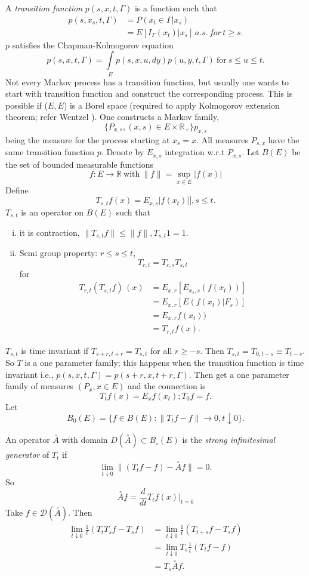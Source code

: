 A \textit{transition function} $p (s,x,t,\Gamma)$ is a function such that 
\begin{align*}
  p(s,x_s, t, \Gamma ) & = P(x_t \in \Gamma | x_s) \\
  & = E[I_\Gamma (x_t) | x_s]\, a.s. \,for\, t \ge s.
\end{align*}
$p$ satisfies the Chapman-Kolmogorov equation
$$
p(s,x,t,\Gamma) = \int\limits_E p(s,x,u,dy) p(u,y,t, \Gamma)
~\text{for}~ s \le u \le t. 
$$
Not every Markov process has a transition function, but usually one
wants to start with transition function and construct the corresponding
process. This is possible if ($E, E$) is a Borel space (required to
apply Kolmogorov extension theorem; refer Wentzel \cite{key27}). One
constructs a Markov family,  
$$
\{ P_{x,s}, (x,s) \in  E \times \mathbb{R}_+ \} p_{x,s}
$$
being the measure for the process starting at $x_s = x$. All measures
$P_{s,x}$ have the same transition function $p$. Denote by $E_{x,s}$
integration w.r.t $P_{x,s}$. Let $B(E)$ be the set of bounded
measurable functions  
$$
f : E \to \mathbb{R} ~\text{with}~\| f \| = \sup_{x \in E} |f(x)|
$$\pageoriginale
Define  
$$
 T_{s,t} f(x) =E_{x,s}| f(x_t)|], s\leq t.
$$
$T_{s,t}$ is an operator on $B(E)$ such that 
\begin{enumerate} [(i)]
\item it is contraction, $\|T_{s,t} f \| \leq \| f\|, T_{s,t}1=1$.

\item Semi group property: $ r \leq s \leq t $, 
  $$
  T_{r,t} = T_{r,s}T_{s,t}
  $$
  for 
  \begin{align*}
    T_{r,t} (T_{s,t }f)\, (x)& = E_{x,r}[E_{x_s,s}(f(x_t))]\\
    & = E_{x,r}[ E(f(x_t)|F_s)]\\
    & = E_{x,r}f(x_t))\\
    & = T_{r,t}f(x).						 
  \end{align*}
\end{enumerate}

$T_{s,t}$ is time invariant if $T_{s+r, t+r} = T_{s,t}$ for all $r
\geq - s$. Then $T_{s,t}= T_{0, t-s}\equiv T_{t-s}$. So $T$ is a one
parameter family; this happens when the transition function is time
invariant  i.e., 
$p(s,x,t,\Gamma) = p(s+r, x, t + r, \Gamma)$. Then get a one
parameter family of measures $(P_x, x \in E)$ and the connection is  
$$
T_t f(x) = E_x f (x_t); T_0 f = f. 
$$
Let 
$$
B_0 (E) = \{ f \in B(E) : \| T_t f - f \| \to 0, t \downarrow 0\}.
$$

An operator $\overset{\circ}{A}$ with domain $D (\overset{\circ}{A})
\subset B_\circ (E)$ is the \textit{strong infinitesimal generator}
of $T_t$ if  
$$
\lim_{t \downarrow 0}\| (T_t f - f ) - \overset{\circ}{A} f \|= 0.
$$
So\pageoriginale  
$$
\overset{\circ}{A} f = \frac{d}{dt} T_t f(x) |_{t=0}
$$
Take $f \in \mathcal{D}(\overset{\circ}{A})$. Then 
\begin{align*}
  \lim_{t \downarrow 0} \frac{1}{t}(T_t T_s f - T_s f ) & = \lim_{t
    \downarrow 0}  \frac{1}{t}(T_{t+s}f - T_s f )\\ 
  & = \lim_{t \downarrow 0} T_s \frac{1}{t}(T_t f - f )\\
  & =T_s \overset{\circ}{A} f.
\end{align*}


